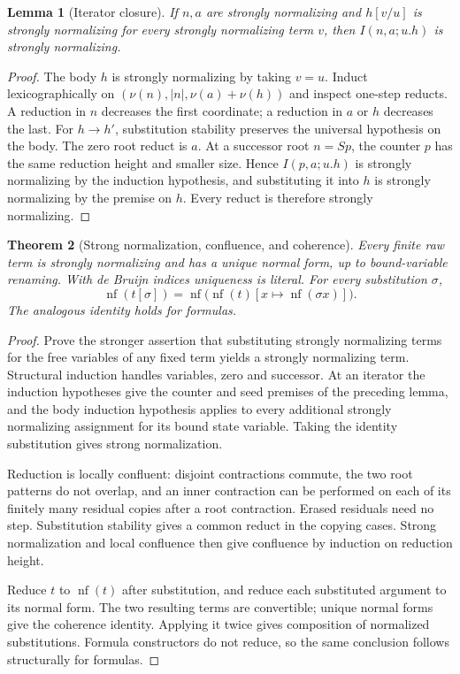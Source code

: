 \documentclass[11pt,letterpaper]{article}
\newtheorem{theorem}{Theorem}[section]
\newtheorem{lemma}[theorem]{Lemma}
\theoremstyle{definition}\newtheorem{definition}[theorem]{Definition}
\theoremstyle{remark}\newtheorem{remark}[theorem]{Remark}
\newcommand{\nf}{\operatorname{nf}}
\begin{document}
\begin{lemma}[Iterator closure]
If $n,a$ are strongly normalizing and $h[v/u]$ is strongly normalizing for
every strongly normalizing term $v$, then $I(n,a;u.h)$ is strongly normalizing.
\end{lemma}
\begin{proof}
The body $h$ is strongly normalizing by taking $v=u$. Induct
lexicographically on $(\nu(n),|n|,\nu(a)+\nu(h))$ and inspect one-step
reducts. A reduction in $n$ decreases the first coordinate; a reduction
in $a$ or $h$ decreases the last. For $h\to h'$, substitution stability
preserves the universal hypothesis on the body. The zero root reduct is
$a$. At a successor root $n=Sp$, the counter $p$ has the same reduction
height and smaller size. Hence $I(p,a;u.h)$ is strongly normalizing by
the induction hypothesis, and substituting it into $h$ is strongly
normalizing by the premise on $h$. Every reduct is therefore strongly
normalizing.
\end{proof}

\begin{theorem}[Strong normalization, confluence, and coherence]
Every finite raw term is strongly normalizing and has a unique normal form,
up to bound-variable renaming. With de Bruijn indices uniqueness is literal.
For every substitution $\sigma$,
\[
 \nf(t[\sigma])=
 \nf\bigl(\nf(t)[x\mapsto\nf(\sigma x)]\bigr).
\]
The analogous identity holds for formulas.
\end{theorem}
\begin{proof}
Prove the stronger assertion that substituting strongly normalizing terms
for the free variables of any fixed term yields a strongly normalizing term.
Structural induction handles variables, zero and successor. At an iterator
the induction hypotheses give the counter and seed premises of the preceding
lemma, and the body induction hypothesis applies to every additional
strongly normalizing assignment for its bound state variable. Taking the
identity substitution gives strong normalization.

Reduction is locally confluent: disjoint contractions commute, the two
root patterns do not overlap, and an inner contraction can be performed
on each of its finitely many residual copies after a root contraction.
Erased residuals need no step. Substitution stability gives a common
reduct in the copying cases. Strong normalization and local confluence
then give confluence by induction on reduction height.

Reduce $t$ to $\nf(t)$ after substitution, and reduce each substituted
argument to its normal form. The two resulting terms are convertible;
unique normal forms give the coherence identity. Applying it twice gives
composition of normalized substitutions. Formula constructors do not
reduce, so the same conclusion follows structurally for formulas.
\end{proof}
\end{document}

